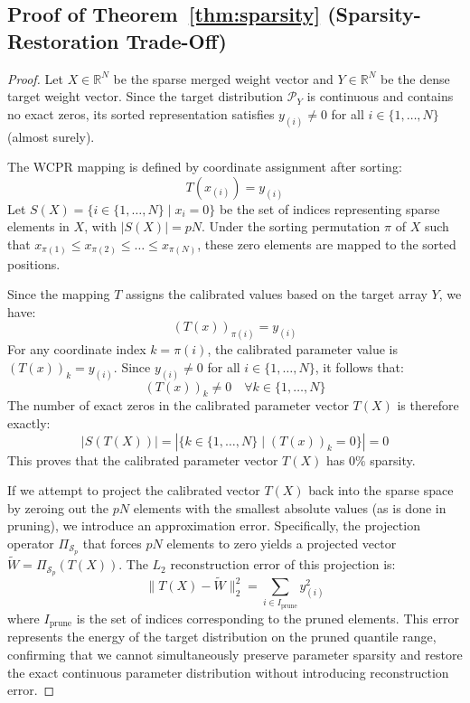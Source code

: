 \documentclass{article}
\theoremstyle{plain}
\theoremstyle{definition}
\theoremstyle{remark}
\begin{document}
\subsection{Proof of Theorem~\ref{thm:sparsity} (Sparsity-Restoration Trade-Off)}
\label{app:proof_sparsity}
\begin{proof}
  Let $X \in \mathbb{R}^N$ be the sparse merged weight vector and $Y \in \mathbb{R}^N$ be the dense target weight vector. Since the target distribution $\mathcal{P}_Y$ is continuous and contains no exact zeros, its sorted representation satisfies $y_{(i)} \neq 0$ for all $i \in \{1, \dots, N\}$ (almost surely).
  
  The WCPR mapping is defined by coordinate assignment after sorting:
  \begin{equation}
    T(x_{(i)}) = y_{(i)}
  \end{equation}
  Let $S(X) = \{i \in \{1, \dots, N\} \mid x_i = 0\}$ be the set of indices representing sparse elements in $X$, with $|S(X)| = p N$. Under the sorting permutation $\pi$ of $X$ such that $x_{\pi(1)} \leq x_{\pi(2)} \leq \dots \leq x_{\pi(N)}$, these zero elements are mapped to the sorted positions.
  
  Since the mapping $T$ assigns the calibrated values based on the target array $Y$, we have:
  \begin{equation}
    (T(x))_{\pi(i)} = y_{(i)}
  \end{equation}
  For any coordinate index $k = \pi(i)$, the calibrated parameter value is $(T(x))_k = y_{(i)}$. Since $y_{(i)} \neq 0$ for all $i \in \{1, \dots, N\}$, it follows that:
  \begin{equation}
    (T(x))_k \neq 0 \quad \forall k \in \{1, \dots, N\}
  \end{equation}
  The number of exact zeros in the calibrated parameter vector $T(X)$ is therefore exactly:
  \begin{equation}
    |S(T(X))| = |\{k \in \{1, \dots, N\} \mid (T(x))_k = 0\}| = 0
  \end{equation}
  This proves that the calibrated parameter vector $T(X)$ has $0\%$ sparsity.
  
  If we attempt to project the calibrated vector $T(X)$ back into the sparse space by zeroing out the $p N$ elements with the smallest absolute values (as is done in pruning), we introduce an approximation error. Specifically, the projection operator $\Pi_{\mathcal{S}_p}$ that forces $p N$ elements to zero yields a projected vector $\tilde{W} = \Pi_{\mathcal{S}_p}(T(X))$. The $L_2$ reconstruction error of this projection is:
  \begin{equation}
    \|T(X) - \tilde{W}\|_2^2 = \sum_{i \in I_{\mathrm{prune}}} y_{(i)}^2
  \end{equation}
  where $I_{\mathrm{prune}}$ is the set of indices corresponding to the pruned elements. This error represents the energy of the target distribution on the pruned quantile range, confirming that we cannot simultaneously preserve parameter sparsity and restore the exact continuous parameter distribution without introducing reconstruction error.
\end{proof}
\end{document}

